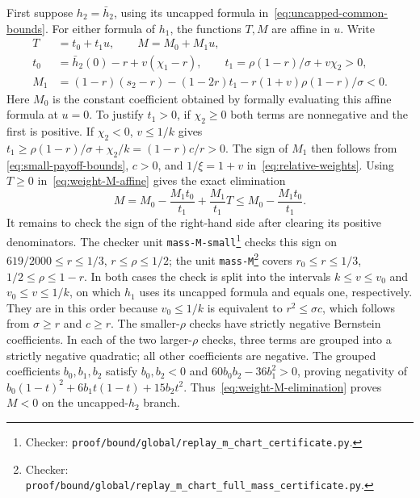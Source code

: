 \documentclass[11pt]{article}
\theoremstyle{remark}
\theoremstyle{plain}
\begin{document}
First suppose $h_2=\bar h_2$, using its uncapped formula
in~\eqref{eq:uncapped-common-bounds}. For either formula of $h_1$,
the functions $T,M$ are affine in $u$. Write
\begin{equation}
 \begin{aligned}
 T&=t_0+t_1u,\qquad M=M_0+M_1u,\\
 t_0&=\bar h_2(0)-r+v(\chi_1-r),\qquad
 t_1=\rho(1-r)/\sigma+v\chi_2>0,\\
 M_1&=(1-r)(s_2-r)-(1-2r)t_1
                        -r(1+v)\rho(1-r)/\sigma<0.
 \end{aligned}
 \label{eq:weight-M-affine}
\end{equation}
Here $M_0$ is the constant coefficient obtained by formally
evaluating this affine formula at $u=0$. To justify $t_1>0$,
if $\chi_2\ge0$ both terms are nonnegative and the first is
positive. If $\chi_2<0$, $v\le1/k$ gives
$t_1\ge\rho(1-r)/\sigma+\chi_2/k=(1-r)c/r>0$.
The sign of $M_1$ then follows from
\eqref{eq:small-payoff-bounds}, $c>0$, and
$1/\xi=1+v$ in~\eqref{eq:relative-weights}.
Using $T\ge0$ in~\eqref{eq:weight-M-affine} gives the exact elimination
\begin{equation}
 M=M_0-\frac{M_1t_0}{t_1}+\frac{M_1}{t_1}T
       \le M_0-\frac{M_1t_0}{t_1}.
 \label{eq:weight-M-elimination}
\end{equation}
It remains to check the sign of the right-hand side after clearing
its positive denominators. The checker unit \nolinkurl{mass-M-small}\footnote{Checker:
\nolinkurl{proof/bound/global/replay_m_chart_certificate.py}.\label{fn:checker-mass-M-small}} checks
this sign on $619/2000\le r\le1/3$, $r\le\rho\le1/2$; the unit
\nolinkurl{mass-M}\footnote{Checker:
\nolinkurl{proof/bound/global/replay_m_chart_full_mass_certificate.py}.\label{fn:checker-mass-M}} covers $r_0\le r\le1/3$,
$1/2\le\rho\le1-r$. In both cases the check is split into the
intervals $k\le v\le v_0$ and $v_0\le v\le1/k$, on which $h_1$ uses
its uncapped formula and equals one, respectively. They are in this order
because $v_0\le1/k$ is equivalent to $r^2\le\sigma c$,
which follows from $\sigma\ge r$ and $c\ge r$.
The smaller-$\rho$ checks have strictly negative Bernstein
coefficients. In each of the two larger-$\rho$ checks, three terms
are grouped into a strictly negative quadratic; all other
coefficients are negative. The grouped coefficients
$b_0,b_1,b_2$ satisfy $b_0,b_2<0$ and
$60b_0b_2-36b_1^2>0$, proving negativity of
$b_0(1-t)^2+6b_1t(1-t)+15b_2t^2$.
Thus~\eqref{eq:weight-M-elimination} proves $M<0$
on the uncapped-$h_2$ branch.
\end{document}
